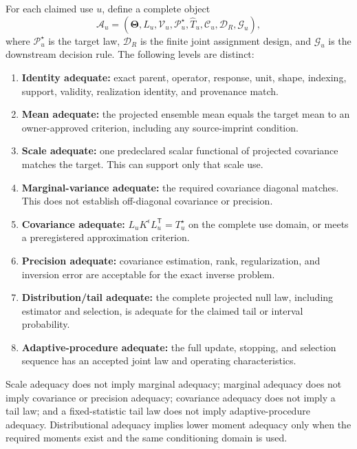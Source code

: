 \documentclass[11pt]{article}
\newcommand{\ThetaV}{\boldsymbol{\Theta}}
\begin{document}
For each claimed use $u$, define a complete object
\begin{equation}
  \mathcal A_u=
  (\ThetaV,L_u,\mathcal V_u,\mathcal P_u^\star,
   \widehat T_u,\mathcal C_u,\mathcal D_R,\mathcal G_u),
  \label{eq:adequacy-object}
\end{equation}
where $\mathcal P_u^\star$ is the target law, $\mathcal D_R$ is the finite
joint assignment design, and $\mathcal G_u$ is the downstream decision rule.
The following levels are distinct:
\begin{enumerate}
\item \textbf{Identity adequate:} exact parent, operator, response, unit,
shape, indexing, support, validity, realization identity, and provenance match.
\item \textbf{Mean adequate:} the projected ensemble mean equals the target
mean to an owner-approved criterion, including any source-imprint condition.
\item \textbf{Scale adequate:} one predeclared scalar functional of projected
covariance matches the target.  This can support only that scale use.
\item \textbf{Marginal-variance adequate:} the required covariance diagonal
matches.  This does not establish off-diagonal covariance or precision.
\item \textbf{Covariance adequate:} $L_uK^\epsilon L_u^{\mathsf T}=T_u^\star$
on the complete use domain, or meets a preregistered approximation criterion.
\item \textbf{Precision adequate:} covariance estimation, rank, regularization,
and inversion error are acceptable for the exact inverse problem.
\item \textbf{Distribution/tail adequate:} the complete projected null law,
including estimator and selection, is adequate for the claimed tail or
interval probability.
\item \textbf{Adaptive-procedure adequate:} the full update, stopping, and
selection sequence has an accepted joint law and operating characteristics.
\end{enumerate}
Scale adequacy does not imply marginal adequacy; marginal adequacy does not
imply covariance or precision adequacy; covariance adequacy does not imply a
tail law; and a fixed-statistic tail law does not imply adaptive-procedure
adequacy.  Distributional adequacy implies lower moment adequacy only when the
required moments exist and the same conditioning domain is used.
\end{document}
